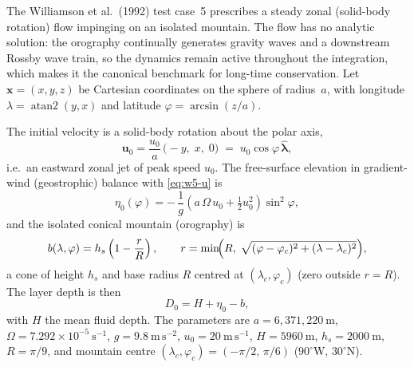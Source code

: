 The Williamson et al.\ (1992) test case~5 prescribes a steady zonal (solid-body
rotation) flow impinging on an isolated mountain. The flow has no analytic
solution: the orography continually generates gravity waves and a downstream
Rossby wave train, so the dynamics remain active throughout the integration,
which makes it the canonical benchmark for long-time conservation. Let
$\mathbf{x}=(x,y,z)$ be Cartesian coordinates on the sphere of radius~$a$, with
longitude $\lambda=\operatorname{atan2}(y,x)$ and latitude
$\varphi=\arcsin(z/a)$.

The initial velocity is a solid-body rotation about the polar axis,
%
\begin{equation}
  \mathbf{u}_0 = \frac{u_0}{a}\,\bigl(-y,\;x,\;0\bigr)
              \;=\; u_0\cos\varphi\,\hat{\boldsymbol{\lambda}},
  \label{eq:w5-u}
\end{equation}
%
i.e.\ an eastward zonal jet of peak speed $u_0$. The free-surface elevation in
gradient-wind (geostrophic) balance with \eqref{eq:w5-u} is
%
\begin{equation}
  \eta_0(\varphi) = -\,\frac{1}{g}\left(a\,\Omega\,u_0 + \tfrac12 u_0^2\right)\sin^2\varphi ,
  \label{eq:w5-eta}
\end{equation}
%
and the isolated conical mountain (orography) is
%
\begin{equation}
  b(\lambda,\varphi) = h_s\left(1 - \frac{r}{R}\right),
  \qquad
  r = \min\!\Bigl(R,\;\sqrt{(\varphi-\varphi_c)^2 + (\lambda-\lambda_c)^2}\Bigr),
  \label{eq:w5-mtn}
\end{equation}
%
a cone of height $h_s$ and base radius $R$ centred at $(\lambda_c,\varphi_c)$
(zero outside $r=R$). The layer depth is then
%
\begin{equation}
  D_0 = H + \eta_0 - b ,
  \label{eq:w5-D}
\end{equation}
%
with $H$ the mean fluid depth. The parameters are
$a = 6{,}371{,}220~\mathrm{m}$,
$\Omega = 7.292\times10^{-5}~\mathrm{s^{-1}}$,
$g = 9.8~\mathrm{m\,s^{-2}}$,
$u_0 = 20~\mathrm{m\,s^{-1}}$,
$H = 5960~\mathrm{m}$,
$h_s = 2000~\mathrm{m}$,
$R = \pi/9$,
and mountain centre $(\lambda_c,\varphi_c) = (-\pi/2,\,\pi/6)$
($90^\circ$W, $30^\circ$N).
